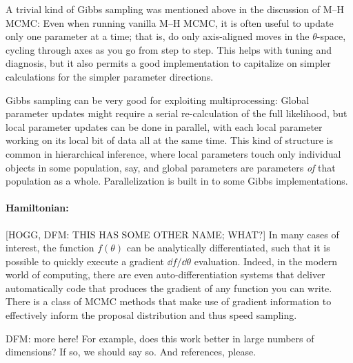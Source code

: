 \documentclass[12pt,twoside,pdftex]{article}
\newcommand{\pars}{\theta}
\begin{document}
A trivial kind of Gibbs sampling was mentioned above in the
discussion of M--H MCMC:
Even when running vanilla M--H MCMC, it is often useful to update only
one parameter at a time; that is, do only axis-aligned moves in the
$\pars$-space, cycling through axes as you go from step to step.
This helps with tuning and diagnosis, but it also permits a good
implementation to capitalize on simpler calculations for the simpler
parameter directions.

Gibbs sampling can be very good for exploiting multiprocessing:
Global parameter updates might require a serial re-calculation of the
full likelihood, but local parameter updates can be done in parallel,
with each local parameter working on its local bit of data all at the
same time.
This kind of structure is common in hierarchical inference, where
local parameters touch only individual objects in some population,
say, and global parameters are parameters \emph{of} that population as
a whole.
Parallelization is built in to some Gibbs implementations.

\paragraph{Hamiltonian:}
[HOGG, DFM: THIS HAS SOME OTHER NAME; WHAT?]
In many cases of interest, the function $f(\pars)$ can be analytically
differentiated, such that it is possible to quickly execute a gradient
$\dd f/\dd\pars$ evaluation.
Indeed, in the modern world of computing, there are even
auto-differentiation systems that deliver automatically code that
produces the gradient of any function you can write.
There is a class of MCMC methods that make use of gradient information
to effectively inform the proposal distribution and thus speed sampling.

DFM: more here!  For example, does this work better in large numbers
of dimensions?  If so, we should say so.  And references, please.
\end{document}
